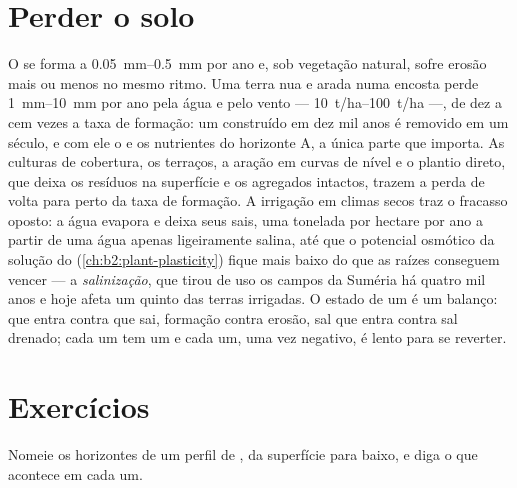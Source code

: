 \section{Perder o solo}

\begin{proposition}\label{prop:b2:living-soil:erosion}
O  se forma a \qtyrange{0.05}{0.5}{mm} por ano e, sob vegetação
natural, sofre erosão mais ou menos no mesmo ritmo. Uma terra nua e
arada numa encosta perde \qtyrange{1}{10}{mm} por ano pela água e pelo
vento --- \qtyrange{10}{100}{t/ha} ---, de dez a cem vezes a taxa de
formação: um  construído em dez mil anos é removido em um século, e
com ele o  e os nutrientes do horizonte A, a única parte que
importa. As culturas de cobertura, os terraços, a aração em curvas de
nível e o plantio direto, que deixa os resíduos na superfície e os
agregados intactos, trazem a perda de volta para perto da taxa de
formação. A irrigação em climas secos traz o fracasso oposto: a água
evapora e deixa seus sais, uma tonelada por hectare por ano a partir de
uma água apenas ligeiramente salina, até que o potencial osmótico da
solução do  (\cref{ch:b2:plant-plasticity}) fique mais baixo do que
as raízes conseguem vencer --- a \emph{salinização}, que tirou de uso os
campos da Suméria há quatro mil anos e hoje afeta um quinto das terras
irrigadas. O estado de um  é um balanço:  que entra contra
 que sai, formação contra erosão, sal que entra contra sal drenado;
cada um tem um  e cada um, uma vez negativo, é lento
para se reverter.
\end{proposition}

\section{Exercícios}

\begin{exercise}[$\star$]\label{exo:b2:living-soil:1}
Nomeie os horizontes de um perfil de , da superfície para baixo, e
diga o que acontece em cada um.
\end{exercise}

